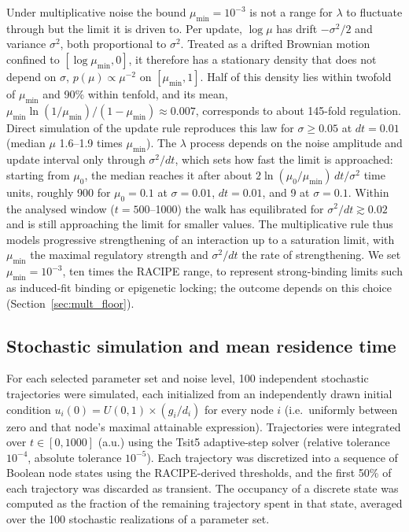 \documentclass[11pt]{article}
\providecommand{\DIFaddtex}[1]{{\protect\color{red}#1}} %
\providecommand{\DIFdeltex}[1]{} %
\providecommand{\DIFaddbegin}{} %
\providecommand{\DIFaddend}{} %
\providecommand{\DIFdelbegin}{} %
\providecommand{\DIFdelend}{} %
\providecommand{\DIFadd}[1]{\texorpdfstring{\DIFaddtex{#1}}{#1}} %
\providecommand{\DIFdel}[1]{\texorpdfstring{\DIFdeltex{#1}}{}} %
\providecommand{\DIFaddincludegraphics}[2][]{\DIFOincludegraphics[#1]{#2}} %
\providecommand{\DIFdelincludegraphics}[2][]{}
\DeclareRobustCommand{\DIFaddbegin}{\DIFOaddbegin \let\includegraphics\DIFaddincludegraphics} %
\DeclareRobustCommand{\DIFaddend}{\DIFOaddend \let\includegraphics\DIFOincludegraphics} %
\DeclareRobustCommand{\DIFdelbegin}{\DIFOdelbegin \let\includegraphics\DIFdelincludegraphics} %
\DeclareRobustCommand{\DIFdelend}{\DIFOaddend \let\includegraphics\DIFOincludegraphics} %
\begin{document}
\DIFaddbegin \DIFadd{Under multiplicative noise the bound $\mu_{\min} = 10^{-3}$ is not a range for $\lambda$ to fluctuate through but the limit it is driven to. Per update, $\log\mu$ has drift $-\sigma^2/2$ and variance $\sigma^2$, both proportional to $\sigma^2$. Treated as a drifted Brownian motion confined to $[\log\mu_{\min}, 0]$, it therefore has a stationary density that does not depend on $\sigma$, $p(\mu) \propto \mu^{-2}$ on $[\mu_{\min}, 1]$. Half of this density lies within twofold of $\mu_{\min}$ and 90\% within tenfold, and its mean, $\mu_{\min}\ln(1/\mu_{\min})/(1-\mu_{\min}) \approx 0.007$, corresponds to about 145-fold regulation. Direct simulation of the update rule reproduces this law for $\sigma \geq 0.05$ at $dt = 0.01$ (median $\mu$ 1.6--1.9 times $\mu_{\min}$). The $\lambda$ process depends on the noise amplitude and update interval only through $\sigma^2/dt$, which sets how fast the limit is approached: starting from $\mu_0$, the median reaches it after about $2\ln(\mu_0/\mu_{\min})\,dt/\sigma^2$ time units, roughly 900 for $\mu_0 = 0.1$ at $\sigma = 0.01$, $dt = 0.01$, and 9 at $\sigma = 0.1$. Within the analysed window ($t = 500$--1000) the walk has equilibrated for $\sigma^2/dt \gtrsim 0.02$ and is still approaching the limit for smaller values. The multiplicative rule thus models progressive strengthening of an interaction up to a saturation limit, with $\mu_{\min}$ the maximal regulatory strength and $\sigma^2/dt$ the rate of strengthening. We set $\mu_{\min} = 10^{-3}$, ten times the RACIPE range, to represent strong-binding limits such as induced-fit binding or epigenetic locking; the outcome depends on this choice (Section~\ref{sec:mult_floor}).
}

\DIFaddend \subsection{Stochastic simulation and mean residence time}

For each selected parameter set and noise level, 100 independent stochastic trajectories were simulated, each initialized from an independently drawn initial condition $u_i(0) = U(0,1) \times (g_i/d_i)$ for every node $i$ (i.e.\ uniformly between zero and that node's maximal attainable expression). Trajectories were integrated over $t \in [0, 1000]$ (a.u.) using the Tsit5 adaptive-step solver (relative tolerance $10^{-4}$, absolute tolerance $10^{-5}$). Each trajectory was discretized into a sequence of Boolean node states using the RACIPE-derived thresholds, and the first 50\% of each trajectory was discarded as transient. \DIFdelbegin \DIFdel{Mean residence time (MRT) for a given }\DIFdelend \DIFaddbegin \DIFadd{The occupancy of a }\DIFaddend discrete state was computed as the fraction of the remaining trajectory \DIFdelbegin \DIFdel{(across all 100 stochastic realizations) }\DIFdelend spent in that state\DIFaddbegin \DIFadd{, averaged over the 100 stochastic realizations of a parameter set}\DIFaddend .
\end{document}

